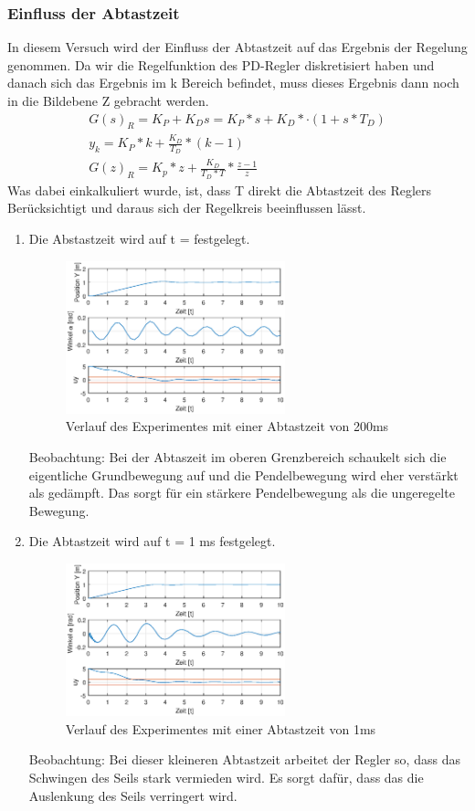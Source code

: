 \documentclass[10pt]{scrartcl}
\begin{document}
\subsubsection{Einfluss der Abtastzeit}
In diesem Versuch wird der Einfluss der Abtastzeit auf das Ergebnis der Regelung genommen. Da wir die Regelfunktion des PD-Regler diskretisiert haben und danach sich das Ergebnis im k Bereich befindet, muss dieses Ergebnis dann noch in die Bildebene Z gebracht werden. 
\begin{align}
   G(s)_R = K_P + K_D s = K_P *s + K_D *·(1 + s *T_D)  \\
   y_k= K_P * k+ \frac{K_D}{T_D} *( k - 1 )  \\
   G(z)_R = K_p * z + \frac{K_D}{T_D*T} *\frac{z-1}{z}
\end{align}
Was dabei einkalkuliert wurde, ist, dass T direkt die Abtastzeit des Reglers Berücksichtigt und daraus sich der Regelkreis beeinflussen lässt.
\begin{enumerate}
\item Die Abstastzeit wird auf t = festgelegt.
\begin{figure}[H]
	\centering
	\includegraphics[width=0.6\textwidth]{Figure45a200mT}
	\caption{Verlauf des Experimentes mit einer Abtastzeit von 200ms}
	\label{img:grafik-dummy}
\end{figure}
Beobachtung:
Bei der Abtaszeit im oberen Grenzbereich schaukelt sich die eigentliche Grundbewegung auf und die Pendelbewegung wird eher verstärkt als gedämpft. Das sorgt für ein stärkere Pendelbewegung als die ungeregelte Bewegung. 
\item Die Abtastzeit wird auf t = 1 ms festgelegt.
\begin{figure}[H]
	\centering
	\includegraphics[width=0.6\textwidth]{45a1mT}
	\caption{Verlauf des Experimentes mit einer Abtastzeit von 1ms}
	\label{img:grafik-dummy}
\end{figure}
Beobachtung: 
Bei dieser kleineren Abtastzeit arbeitet der Regler so, dass das Schwingen des Seils stark vermieden wird. Es sorgt dafür, dass das die Auslenkung des Seils verringert wird.
\end{enumerate}
\end{document}
